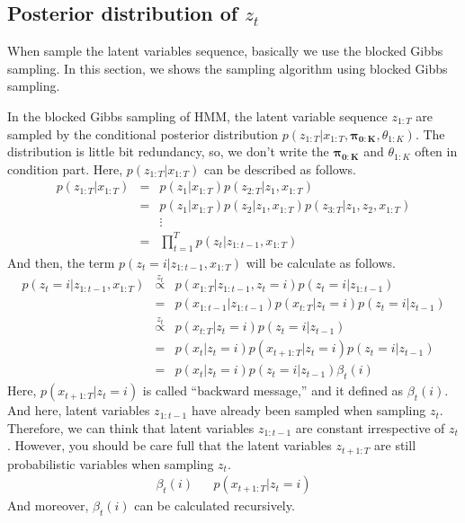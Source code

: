 \documentclass[a4paper]{article}
\newcommand{\proptoas}[1]{\overset{#1}{\propto}}
\DeclareMathOperator{\defeq}{\ensuremath{\stackrel{\mathrm{def}}{=}}}
\begin{document}
\subsection{Posterior distribution of $z_t$}
When sample the latent variables sequence, basically we use the blocked Gibbs sampling.
In this section, we shows the sampling algorithm using blocked Gibbs sampling.
\par
In the blocked Gibbs sampling of HMM, the latent variable sequence $z_{1:T}$ are sampled by the conditional posterior distribution $p(z_{1:T} | x_{1:T}, \boldsymbol{\pi_{0:K}}, \theta_{1:K})$.
The distribution is little bit redundancy, so, we don't write the $\boldsymbol{\pi_{0:K}}$ and $\theta_{1:K}$ often in condition part.
Here, $p(z_{1:T} | x_{1:T})$ can be described as follows.
\begin{eqnarray}
	p(z_{1:T} | x_{1:T}) &=& p(z_1 | x_{1:T}) p(z_{2:T} | z_1, x_{1:T}) \\
	&=&
	p(z_1 | x_{1:T}) p(z_2 | z_1, x_{1:T}) p(z_{3:T} | z_1, z_2, x_{1:T}) \\
	&&
	\vdots \\
	&=&
	\prod_{t=1}^{T}{p(z_{t} | z_{1:t-1}, x_{1:T})}
\end{eqnarray}
And then, the term $p(z_{t} = i | z_{1:t-1}, x_{1:T})$ will be calculate as follows.
\begin{eqnarray}
	p(z_{t} = i | z_{1:t-1}, x_{1:T})
	&\proptoas{z_t}&
	p(x_{1:T} | z_{1:t-1}, z_t = i) p(z_t = i | z_{1:t-1})\\
	&=&
	p(x_{1:t-1} | z_{1:t-1}) p(x_{t:T} | z_t = i) p(z_t = i | z_{t-1}) \\
	&\proptoas{z_t}&
	p(x_{t:T} | z_t = i) p(z_t = i | z_{t-1}) \\
	&=&
	p(x_t | z_t = i) p(x_{t+1:T} | z_t = i) p(z_t = i | z_{t-1}) \\
	&=&
	p(x_t | z_t = i) p(z_t = i | z_{t-1}) \beta_t(i)
\end{eqnarray}
Here, $p(x_{t+1:T} | z_t = i)$ is called ``backward message,'' and it defined as $\beta_t(i)$.
And here, latent variables $z_{1:t-1}$ have already been sampled when sampling $z_t$.
Therefore, we can think that latent variables $z_{1:t-1}$ are constant irrespective of $z_t$.
However, you should be care full that the latent variables $z_{t+1:T}$ are still probabilistic variables when sampling $z_t$.
\begin{eqnarray}
	\beta_t(i)
	&\defeq&
	p(x_{t+1:T} | z_t = i)
\end{eqnarray}
And moreover, $\beta_t(i)$ can be calculated recursively.
\end{document}
